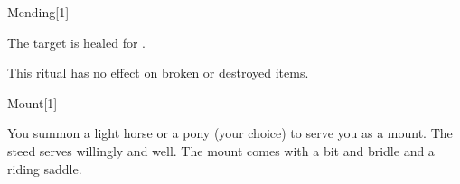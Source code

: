 \begin{spellsection}{Mending}[1]
    \begin{spellheader}
    \end{spellheader}
    \begin{spellcontent}
        \begin{spelltargetinginfo}
        \end{spelltargetinginfo}
        \begin{spelleffects}
            \spelleffect The target is healed for \spelldamage{}.
        \end{spelleffects}
    \end{spellcontent}
    \begin{spellfooter}
        \spellnotes This ritual has no effect on broken or destroyed items.
    \end{spellfooter}
    \begin{spellaugments}
    \end{spellaugments}
\end{spellsection}

\begin{spellsection}{Mount}[1]
    \begin{spellheader}
    \end{spellheader}
    \begin{spellcontent}
        \begin{spelltargetinginfo}
            \spellrng{\rngclose}
        \end{spelltargetinginfo}
        \begin{spelleffects}
            \spelleffect You summon a light horse or a pony (your choice) to serve you as a mount. The steed serves willingly and well. The mount comes with a bit and bridle and a riding saddle.
            \spelldur \durext \dismissable
        \end{spelleffects}
    \end{spellcontent}
    \begin{spellfooter}
    \end{spellfooter}
\end{spellsection}

